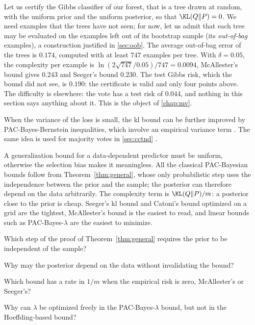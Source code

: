 \begin{running}
Let us certify the Gibbs classifier of our forest, that is a tree drawn at
random, with the uniform prior and the uniform posterior, so that $\KL(Q\|P)=0$.
We need examples that the trees have not seen; for now, let us admit that each
tree may be evaluated on the examples left out of its bootstrap sample (its
\emph{out-of-bag} examples), a construction justified in \cref{sec:oob}. The
average out-of-bag error of the trees is $0.174$, computed with at least $747$
examples per tree. With $\delta=0.05$, the complexity per example is
$\ln(2\sqrt{747}/0.05)/747=0.0094$, McAllester's bound gives $0.243$ and Seeger's
bound $0.230$. The test Gibbs risk, which the bound did not see, is $0.190$: the
certificate is valid and only four points above. The difficulty is elsewhere:
the vote has a test risk of $0.044$, and nothing in this section says anything
about it. This is the object of \cref{chap:mv}.
\end{running}

\begin{remark}
When the variance of the loss is small, the kl bound can be further improved
by PAC-Bayes-Bernstein inequalities, which involve an empirical variance term
\citep{tolstikhin2013pac,mhammedi2019pac}. The same idea is used for majority
votes in \cref{sec:cctnd} \citep{wu2021chebyshev}.
\end{remark}

\begin{keypoints}
A generalization bound for a data-dependent predictor must be uniform, otherwise
the selection bias makes it meaningless. All the classical PAC-Bayesian bounds
follow from Theorem~\ref{thm:general}, whose only probabilistic step uses the
independence between the prior and the sample; the posterior can therefore
depend on the data arbitrarily. The complexity term is $\KL(Q\|P)/m$: a posterior
close to the prior is cheap. Seeger's kl bound and Catoni's bound optimized on a
grid are the tightest, McAllester's bound is the easiest to read, and linear
bounds such as PAC-Bayes-$\lambda$ are the easiest to minimize.
\end{keypoints}

\begin{quickchecks}
\item Which step of the proof of Theorem~\ref{thm:general} requires the prior to be independent of the sample?
\item Why may the posterior depend on the data without invalidating the bound?
\item Which bound has a rate in $1/m$ when the empirical risk is zero, McAllester's or Seeger's?
\item Why can $\lambda$ be optimized freely in the PAC-Bayes-$\lambda$ bound, but not in the Hoeffding-based bound?
\end{quickchecks}

